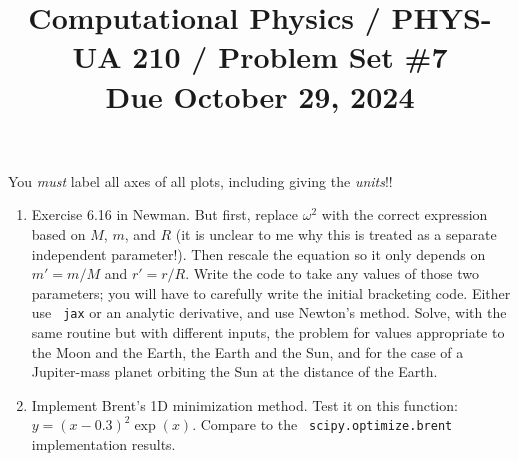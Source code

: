 \documentclass[11pt, preprint]{aastex}
\begin{document}
\title{\bf Computational Physics / PHYS-UA 210 / Problem Set \#7
\\ Due October 29, 2024 }

You {\it must} label all axes of all plots, including giving the {\it
  units}!!

\begin{enumerate}
\item Exercise 6.16 in Newman. But first, replace $\omega^2$ with the
  correct expression based on $M$, $m$, and $R$ (it is unclear to me
  why this is treated as a separate independent parameter!). Then
  rescale the equation so it only depends on $m' = m/M$ and $r'=r/R$.
  Write the code to take any values of those two parameters; you will
  have to carefully write the initial bracketing code. Either use {\tt
    jax} or an analytic derivative, and use Newton's method. Solve,
  with the same routine but with different inputs, the problem for
  values appropriate to the Moon and the Earth, the Earth and the Sun,
  and for the case of a Jupiter-mass planet orbiting the Sun at the
  distance of the Earth.
\item Implement Brent's 1D minimization method. Test it on this
function: $y= (x -0.3)^2 \exp(x)$. Compare to the {\tt
scipy.optimize.brent} implementation results.
\end{enumerate}
\end{document}
